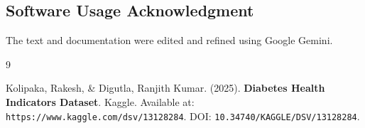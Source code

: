 \documentclass[conference]{IEEEtran}
\begin{document}
\subsection*{Software Usage Acknowledgment}
The text and documentation were edited and refined using Google Gemini.

\begin{thebibliography}{9} %
	
Kolipaka, Rakesh, \& Digutla, Ranjith Kumar. (2025). \textbf{Diabetes Health Indicators Dataset}. 
Kaggle. Available at: \texttt{https://www.kaggle.com/dsv/13128284}. 
DOI: \texttt{10.34740/KAGGLE/DSV/13128284}.
	
\end{thebibliography}

\vspace{12pt}
\end{document}
